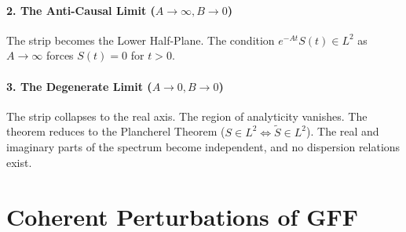\documentclass[a4paper,11pt]{article}
\theoremstyle{definition}
\begin{document}
\paragraph{2. The Anti-Causal Limit ($A \to \infty, B \to 0$)}
The strip becomes the Lower Half-Plane. The condition $e^{-At}S(t) \in L^2$ as $A \to \infty$ forces $S(t) = 0$ for $t>0$.

\paragraph{3. The Degenerate Limit ($A \to 0, B \to 0$)}
The strip collapses to the real axis. The region of analyticity vanishes. The theorem reduces to the Plancherel Theorem ($S \in L^2 \iff \tilde{S} \in L^2$). The real and imaginary parts of the spectrum become independent, and no dispersion relations exist.
\section{Coherent Perturbations of GFF}
\end{document}
